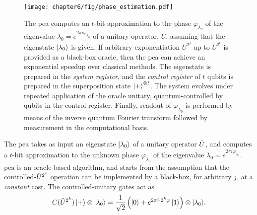 \begin{figure}[t!]
\centering
\texttt{[image: chapter6/fig/phase\_estimation.pdf]}
\caption[Quantum phase estimation algorithm]{
    The \gls{pea} computes an $t$-bit approximation to the phase $\varphi_{\lambda_0}$ of the eigenvalue $\lambda_0 = e^{2\pi i \varphi_{\lambda_0}}$ of a unitary operator, $U$, assuming that the eigenstate $\mbox{$ | \lambda_0 \rangle $}$ is given. If arbitrary exponentiation $U^{2^j}$ up to $U^{2^t}$ is provided as a black-box oracle, then the \gls{pea} can achieve an exponential speedup over classical methods. The eigenstate is prepared in the \emph{system register}, and the \emph{control register} of $t$ qubits is prepared in the superposition state $\mbox{$ | + \rangle $}^{\otimes t}$. The system evolves under repeated application of the oracle unitary, quantum-controlled by qubits in the control register. Finally, readout of $\varphi_{\lambda_0}$ is performed by means of the inverse quantum Fourier transform followed by measurement in the computational basis. 
}
\label{fig:phase-estimation}
\end{figure}

The \gls{pea} takes as input an eigenstate $\mbox{$ | \lambda_0 \rangle $}$ of a unitary operator $\hat{U}$, and computes a $t$-bit approximation to the unknown phase $\varphi_{\lambda_0}$ of the eigenvalue $\lambda_0 = e^{2\pi i \varphi_{\lambda_0}}$. \gls{pea} is an oracle-based algorithm, and starts from the assumption that the controlled-$\hat{U}^{2^j}$ operation can be implemented by a black-box, for arbitrary $j$, at a \emph{constant} cost. The controlled-unitary gates act as 
\begin{equation}
    C(\hat{U}^{2^k}) \, \mbox{$ | + \rangle $}\otimes \mbox{$ | \lambda_0 \rangle $} = \frac{1}{\sqrt{2}} \left(\mbox{$ | 0 \rangle $}+e^{2\pi i \cdot 2^k \varphi} \, \mbox{$ | 1 \rangle $}\right) \otimes \mbox{$ | \lambda_0 \rangle $}. 
\end{equation}


